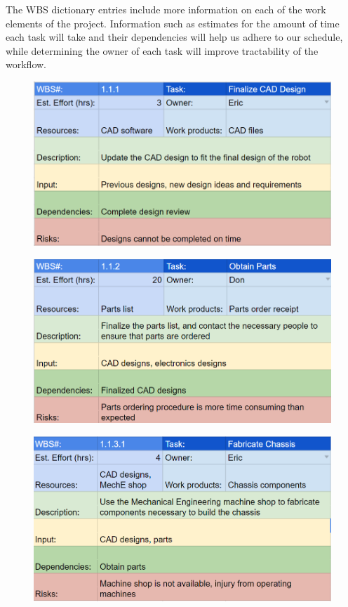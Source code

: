 \clearpage

The WBS dictionary entries include more information on each of the work elements of the project. Information such as estimates for the amount of time each task will take and their dependencies will help us adhere to our schedule, while determining the owner of each task will improve tractability of the workflow.

\begin{figure}[h!]
\centering
\includegraphics[width=0.98\columnwidth]{wbs_schedule/wbs_dict_hw1.PNG}
\label{fig:hw1}
\end{figure}
\begin{figure}[h!]
\centering
\includegraphics[width=0.98\columnwidth]{wbs_schedule/wbs_dict_hw2.PNG}
\label{fig:hw2}
\end{figure}
\begin{figure}[h!]
\centering
\includegraphics[width=0.98\columnwidth]{wbs_schedule/wbs_dict_hw3.PNG}
\label{fig:hw3}
\end{figure}
